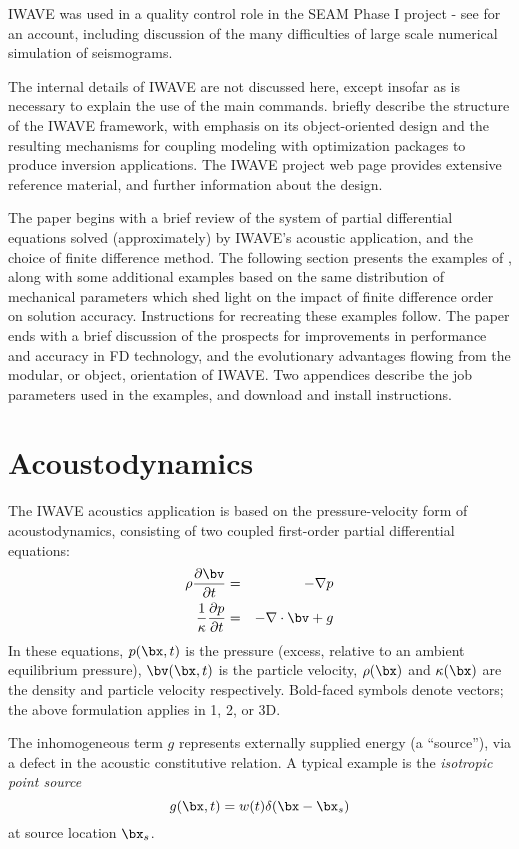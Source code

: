 IWAVE was used in a quality control role in the SEAM Phase I project -
see \cite{FehlerKeliher:2011} for an account, including discussion of
the many difficulties of large scale numerical simulation of seismograms.

The internal details of IWAVE are not discussed here, except insofar
as is necessary to explain the use of the main
commands. \cite{GeoPros:11} briefly describe the structure of the
IWAVE framework, with emphasis on its object-oriented design and the
resulting mechanisms for coupling modeling with optimization packages
to produce inversion applications. The IWAVE project web page \cite[]{IWAVE}
provides extensive reference material, and further information about
the design.

The paper begins with a brief review of the system of partial
differential equations solved (approximately) by IWAVE's acoustic
application, and the choice of finite difference method. The following
section presents the examples of
\cite{SymesVdovina:09}, along with some additional examples based on
the same distribution of mechanical parameters which shed light on the
impact of finite difference order on solution accuracy. Instructions
for recreating these examples follow. The paper ends with a brief
discussion of the prospects for improvements in performance and
accuracy in FD technology, and the evolutionary advantages flowing from the
modular, or object, orientation of IWAVE. Two appendices describe the
job parameters used in the examples, and download and install instructions.
 
\section{Acoustodynamics}
The IWAVE acoustics application is based on the pressure-velocity form of
acoustodynamics, consisting of two coupled first-order partial
differential equations:
\begin{eqnarray}
\label{awe}
\rho \frac{\partial \bv}{\partial t} &=& - \nabla p \\
\frac{1}{\kappa}\frac{\partial p}{\partial t} &=& -\nabla \cdot \bv + g
\end{eqnarray}
In these equations, $p(\bx,t)$ is the pressure (excess, relative to an
ambient equilibrium pressure), $\bv(\bx,t)$ is the particle velocity,
$\rho(\bx)$ and $\kappa(\bx)$ are the density and particle velocity
respectively. Bold-faced symbols denote vectors; the above formulation
applies in 1, 2, or 3D.

The inhomogeneous term $g$ represents externally supplied energy (a
``source''), via a defect in the acoustic constitutive relation. A
typical example is the {\em isotropic point source}
\[
g(\bx,t) = w(t) \delta(\bx-\bx_s)
\]
at source location $\bx_s$.

